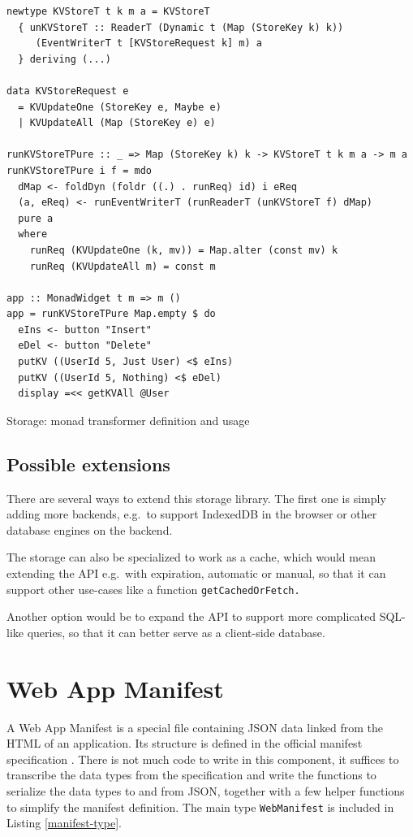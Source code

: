 \documentclass[english,zadani,odsaz]{fitthesis}
\begin{document}
\begin{listing}[tb]
\begin{verbatim}
newtype KVStoreT t k m a = KVStoreT
  { unKVStoreT :: ReaderT (Dynamic t (Map (StoreKey k) k))
     (EventWriterT t [KVStoreRequest k] m) a
  } deriving (...)

data KVStoreRequest e
  = KVUpdateOne (StoreKey e, Maybe e)
  | KVUpdateAll (Map (StoreKey e) e)

runKVStoreTPure :: _ => Map (StoreKey k) k -> KVStoreT t k m a -> m a
runKVStoreTPure i f = mdo
  dMap <- foldDyn (foldr ((.) . runReq) id) i eReq
  (a, eReq) <- runEventWriterT (runReaderT (unKVStoreT f) dMap)
  pure a
  where
    runReq (KVUpdateOne (k, mv)) = Map.alter (const mv) k
    runReq (KVUpdateAll m) = const m

app :: MonadWidget t m => m ()
app = runKVStoreTPure Map.empty $ do
  eIns <- button "Insert"
  eDel <- button "Delete"
  putKV ((UserId 5, Just User) <$ eIns)
  putKV ((UserId 5, Nothing) <$ eDel)
  display =<< getKVAll @User
\end{verbatim}
\caption{Storage: monad transformer definition and usage \label{storage-impl}}
\end{listing}

\subsection{Possible extensions}
\label{sec:org5318433}
There are several ways to extend this storage library. The first one is simply
adding more backends, e.g.~to support IndexedDB in the browser or other
database engines on the backend.

The storage can also be specialized to work as a cache, which would mean
extending the API e.g.~with expiration, automatic or manual, so that it can
support other use-cases like a function \texttt{getCachedOrFetch.}

Another option would be to expand the API to support more complicated SQL-like
queries, so that it can better serve as a client-side database.

\section{Web App Manifest}
\label{sec:orga872acd}
A Web App Manifest is a special file containing JSON data linked from the HTML
of an application. Its structure is defined in the official manifest
specification \cite{webapp-manifest}. There is not much code to write in this
component, it suffices to transcribe the data types from the specification and
write the functions to serialize the data types to and from JSON, together with
a few helper functions to simplify the manifest definition. The main type
\texttt{WebManifest} is included in Listing \ref{manifest-type}.
\end{document}
